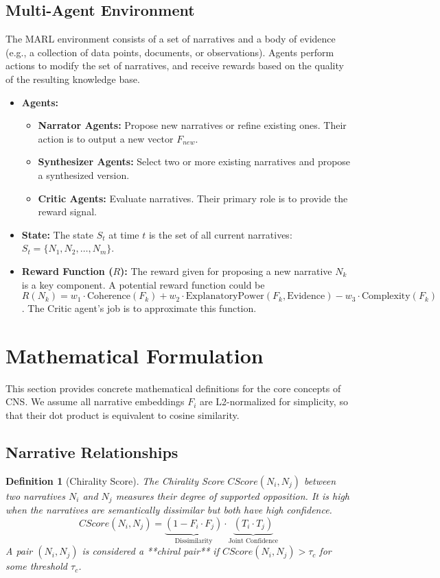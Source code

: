 \documentclass[12pt, a4paper]{article}
\newtheorem{definition}{Definition}
\begin{document}
\subsection{Multi-Agent Environment}
The MARL environment consists of a set of narratives and a body of evidence (e.g., a collection of data points, documents, or observations). Agents perform actions to modify the set of narratives, and receive rewards based on the quality of the resulting knowledge base.
\begin{itemize}
    \item \textbf{Agents:}
        \begin{itemize}
            \item \textbf{Narrator Agents:} Propose new narratives or refine existing ones. Their action is to output a new vector $F_{new}$.
            \item \textbf{Synthesizer Agents:} Select two or more existing narratives and propose a synthesized version.
            \item \textbf{Critic Agents:} Evaluate narratives. Their primary role is to provide the reward signal.
        \end{itemize}
    \item \textbf{State:} The state $S_t$ at time $t$ is the set of all current narratives: $S_t = \{N_1, N_2, \dots, N_m\}$.
    \item \textbf{Reward Function ($R$):} The reward given for proposing a new narrative $N_k$ is a key component. A potential reward function could be $R(N_k) = w_1 \cdot \text{Coherence}(F_k) + w_2 \cdot \text{ExplanatoryPower}(F_k, \text{Evidence}) - w_3 \cdot \text{Complexity}(F_k)$. The Critic agent's job is to approximate this function.
\end{itemize}

\section{Mathematical Formulation}

This section provides concrete mathematical definitions for the core concepts of CNS. We assume all narrative embeddings $F_i$ are L2-normalized for simplicity, so that their dot product is equivalent to cosine similarity.

\subsection{Narrative Relationships}

\begin{definition}[Chirality Score]
The Chirality Score $CScore(N_i, N_j)$ between two narratives $N_i$ and $N_j$ measures their degree of supported opposition. It is high when the narratives are semantically dissimilar but both have high confidence.
\[
CScore(N_i, N_j) = \underbrace{(1 - F_i \cdot F_j)}_{\text{Dissimilarity}} \cdot \underbrace{(T_i \cdot T_j)}_{\text{Joint Confidence}}
\]
A pair $(N_i, N_j)$ is considered a **chiral pair** if $CScore(N_i, N_j) > \tau_c$ for some threshold $\tau_c$.
\end{definition}
\end{document}
